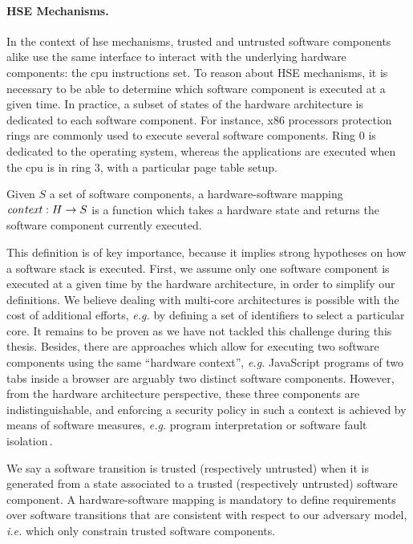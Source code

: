\paragraph{HSE Mechanisms.}
%
In the context of \ac{hse} mechanisms, trusted and untrusted software components
alike use the same interface to interact with the underlying hardware
components: the \ac{cpu} instructions set.
%
To reason about HSE mechanisms, it is necessary to be able to determine which
software component is executed at a given time.
%
In practice, a subset of states of the hardware architecture is dedicated to
each software component.
%
For instance, x86 processors protection rings are commonly used to execute
several software components.
%
Ring 0 is dedicated to the operating system, whereas the applications are
executed when the \ac{cpu} is in ring 3, with a particular page table setup.

\begin{definition}
  \label{def:speccert:hardsoft}
  Given \( S \) a set of software components, a hardware-software mapping
  $\mathit{con\-text} : H \rightarrow S$ is a function which takes a hardware
  state and returns the software component currently executed.
\end{definition}

This definition is of key importance, because it implies strong hypotheses on
how a software stack is executed.
%
First, we assume only one software component is executed at a given time by the
hardware architecture, in order to simplify our definitions.
%
We believe dealing with multi-core architectures is possible with the cost of
additional efforts, \emph{e.g.} by defining a set of identifiers to select a
particular core.
%
It remains to be proven as we have not tackled this challenge during this
thesis.
%
Besides, there are approaches which allow for executing two software components
using the same ``hardware context'', \emph{e.g.} JavaScript programs of two tabs
inside a browser are arguably two distinct software components.
%
However, from the hardware architecture perspective, these three components are
indistinguishable, and enforcing a security policy in such a context is achieved
by means of software measures, \emph{e.g.} program interpretation or software
fault isolation\,\cite{morrisett2012rocksalt}.

We say a software transition is trusted (respectively untrusted) when it is
generated from a state associated to a trusted (respectively untrusted) software
component.
%
A hardware-software mapping is mandatory to define requirements over software
transitions that are consistent with respect to our adversary model, \emph{i.e.}
which only constrain trusted software components.

